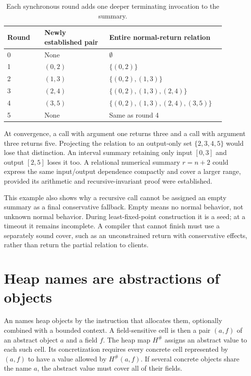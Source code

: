 \begin{table}
\centering
\caption{Each synchronous round adds one deeper terminating invocation to the summary.}
\label{tab:ch44-recursive-pairs}
\begin{tabular}{p{0.16\linewidth}p{0.28\linewidth}p{0.45\linewidth}}
\toprule
Round & Newly established pair & Entire normal-return relation \\
\midrule
0 & None & $\emptyset$ \\
1 & $(0,2)$ & $\{(0,2)\}$ \\
2 & $(1,3)$ & $\{(0,2),(1,3)\}$ \\
3 & $(2,4)$ & $\{(0,2),(1,3),(2,4)\}$ \\
4 & $(3,5)$ & $\{(0,2),(1,3),(2,4),(3,5)\}$ \\
5 & None & Same as round 4 \\
\bottomrule
\end{tabular}
\end{table}

At convergence, a call with argument one returns three and a call with argument three returns five.
Projecting the relation to an output-only set $\{2,3,4,5\}$ would lose that distinction.
An interval summary retaining only input $[0,3]$ and output $[2,5]$ loses it too.
A relational numerical summary $r=n+2$ could express the same input/output dependence compactly and cover a larger range, provided its arithmetic and recursive-invariant proof were established.

This example also shows why a recursive call cannot be assigned an empty summary as a final conservative fallback.
Empty means no normal behavior, not unknown normal behavior.
During least-fixed-point construction it is a seed; at a timeout it remains incomplete.
A compiler that cannot finish must use a separately sound cover, such as an unconstrained return with conservative effects, rather than return the partial relation to clients.

\section{Heap names are abstractions of objects}
\label{sec:ch44-heap-names}

An  names heap objects by the instruction that allocates them, optionally combined with a bounded context.
A field-sensitive cell is then a pair $(a,f)$ of an abstract object $a$ and a field $f$.
The heap map $H^\#$ assigns an abstract value to each such cell.
Its concretization requires every concrete cell represented by $(a,f)$ to have a value allowed by $H^\#(a,f)$.
If several concrete objects share the name $a$, the abstract value must cover all of their fields.

